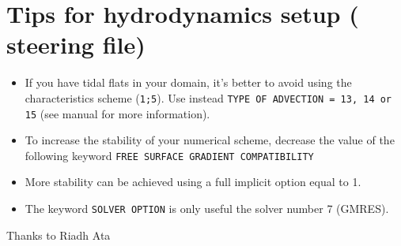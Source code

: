 \section{Tips for hydrodynamics setup ( steering file)}
\begin{itemize}
\item If you have tidal flats in your domain, it's better to avoid using the characteristics scheme (\texttt{1;5}). Use instead \texttt{TYPE OF ADVECTION = 13, 14 or 15} (see  manual for more information).
\item To increase the stability of your numerical scheme, decrease the value of the following keyword \texttt{FREE SURFACE GRADIENT COMPATIBILITY}
\item More stability can be achieved using a full implicit option equal to 1.
\item The keyword \texttt{SOLVER OPTION} is only useful the solver number 7 (GMRES).
\end{itemize}

{\footnotesize Thanks to Riadh Ata}

